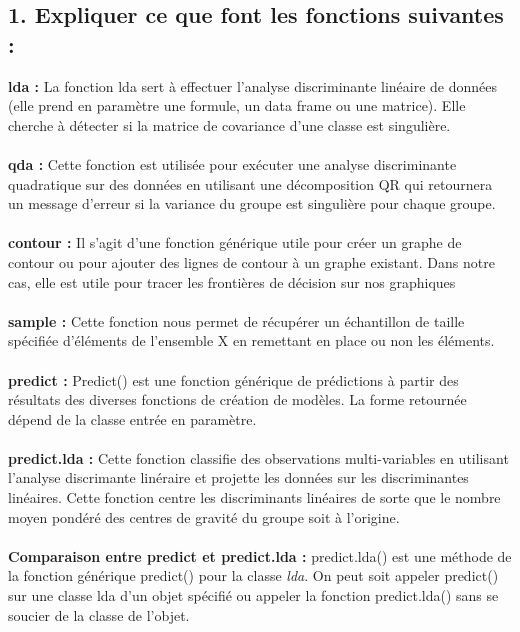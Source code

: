 \documentclass[a4paper, 10pt]{article}
\begin{document}
\subsection*{1. Expliquer ce que font les fonctions suivantes :}
\textbf{lda :} La fonction lda sert à effectuer l'analyse discriminante linéaire de données
(elle prend en paramètre une formule, un data frame ou une matrice).
Elle cherche à détecter si la matrice de covariance d'une classe est singulière.\\ \\
\textbf{qda :} Cette fonction est utilisée pour exécuter une analyse discriminante quadratique sur des données
en utilisant une décomposition QR qui retournera un message d'erreur si la variance du groupe est singulière pour chaque groupe.\\ \\
\textbf{contour :} Il s'agit d'une fonction générique utile pour créer un graphe de contour ou
pour ajouter des lignes de contour à un graphe existant.
Dans notre cas, elle est utile pour tracer les frontières de décision sur nos graphiques\\ \\
\textbf{sample :} Cette fonction nous permet de récupérer un échantillon de taille spécifiée d'éléments de l'ensemble X
en remettant en place ou non les éléments.\\ \\
\textbf{predict :} Predict() est une fonction générique de prédictions à partir des résultats des diverses fonctions de création de modèles.
La forme retournée dépend de la classe entrée en paramètre.\\ \\
\textbf{predict.lda :} Cette fonction classifie des observations multi-variables en utilisant l'analyse discrimante linéraire et
projette les données sur les discriminantes linéaires.
Cette fonction centre les discriminants linéaires de sorte que le nombre moyen pondéré des centres de gravité du groupe soit à l'origine.\\ \\
\textbf{Comparaison entre predict et predict.lda :} predict.lda() est une méthode de la fonction générique predict() pour la classe \textit{lda}.
On peut soit appeler predict() sur une classe lda d'un objet spécifié ou
appeler la fonction predict.lda() sans se soucier de la classe de l'objet.\\ \\
\end{document}
